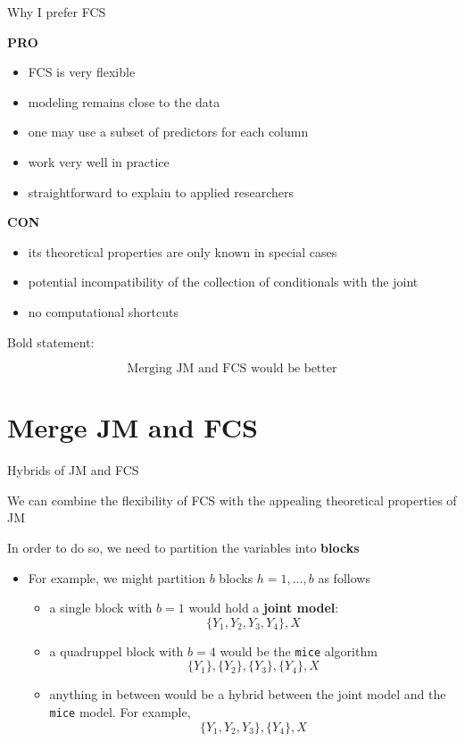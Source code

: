 \documentclass[ignorenonframetext,]{beamer}
\providecommand{\tightlist}{%
  \setlength{\itemsep}{0pt}\setlength{\parskip}{0pt}}
\begin{document}
\begin{frame}{Why I prefer FCS}
\protect\hypertarget{why-i-prefer-fcs}{}

\textbf{PRO}

\begin{itemize}
\tightlist
\item
  FCS is very flexible
\item
  modeling remains close to the data
\item
  one may use a subset of predictors for each column
\item
  work very well in practice
\item
  straightforward to explain to applied researchers
\end{itemize}

\textbf{CON}

\begin{itemize}
\tightlist
\item
  its theoretical properties are only known in special cases
\item
  potential incompatibility of the collection of conditionals with the
  joint
\item
  no computational shortcuts
\end{itemize}

Bold statement:

\[\text{Merging JM and FCS would be better}\]

\end{frame}

\hypertarget{merge-jm-and-fcs}{%
\section{Merge JM and FCS}\label{merge-jm-and-fcs}}

\begin{frame}[fragile]{Hybrids of JM and FCS}
\protect\hypertarget{hybrids-of-jm-and-fcs}{}

We can combine the flexibility of FCS with the appealing theoretical
properties of JM

In order to do so, we need to partition the variables into
\textbf{blocks}

\begin{itemize}
\item
  For example, we might partition \(b\) blocks \(h = 1,\dots,b\) as
  follows

  \begin{itemize}
  \item
    a single block with \(b=1\) would hold a \textbf{joint model}:
    \[\{Y_1, Y_2, Y_3, Y_4\}, X\]
  \item
    a quadruppel block with \(b=4\) would be the \texttt{mice} algorithm
    \[\{Y_1\},\{Y_2\},\{Y_3\},\{Y_4\}, X\]
  \item
    anything in between would be a hybrid between the joint model and
    the \texttt{mice} model. For example,
    \[\{Y_1, Y_2, Y_3\},\{Y_4\}, X\]
  \end{itemize}
\end{itemize}

\end{frame}
\end{document}
